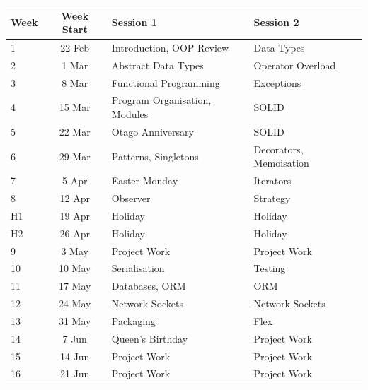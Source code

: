 \documentclass{article}
\begin{document}
\renewcommand{\arraystretch}{1.5}
\begin{tabular}{|l|c|l|l|}
\hline
 Week     & Week Start & Session 1                          & Session 2               \\ \hline
 1        & 22 Feb     & Introduction, OOP Review           & Data Types              \\ \hline
 2        &  1 Mar     & Abstract Data Types                & Operator Overload       \\ \hline
 3        &  8 Mar     & Functional Programming             & Exceptions              \\ \hline
 4        & 15 Mar     & Program Organisation, Modules      & SOLID                   \\ \hline
 5        & 22 Mar     & Otago Anniversary                  & SOLID                   \\ \hline
 6        & 29 Mar     & Patterns, Singletons               & Decorators, Memoisation \\ \hline
 7        &  5 Apr     & Easter Monday                      & Iterators               \\ \hline
 8        & 12 Apr     & Observer                           & Strategy                \\ \hline
 H1       & 19 Apr     & Holiday                            & Holiday                 \\ \hline
 H2       & 26 Apr     & Holiday                            & Holiday                 \\ \hline
 9        &  3 May     & Project Work                       & Project Work            \\ \hline
 10       & 10 May     & Serialisation                      & Testing                 \\ \hline
 11       & 17 May     & Databases, ORM                     & ORM                     \\ \hline
 12       & 24 May     & Network Sockets                    & Network Sockets         \\ \hline
 13       & 31 May     & Packaging                          & Flex                    \\ \hline
 14       &  7 Jun     & Queen's Birthday                   & Project Work            \\ \hline
 15       & 14 Jun     & Project Work                       & Project Work            \\ \hline
 16       & 21 Jun     & Project Work                       & Project Work            \\ \hline
\end{tabular}
\end{document}
